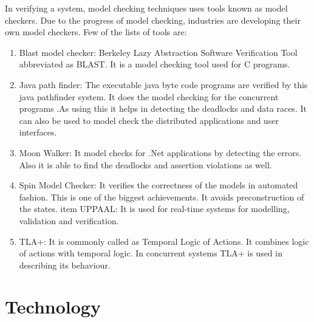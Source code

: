 \documentclass{article}
\begin{document}
In verifying a system, model checking techniques uses tools known as model checkers. Due to the progress of model checking, industries are developing their own model checkers.
Few of the lists of tools are:\newline
\begin{enumerate}
\item  Blast model checker: Berkeley Lazy Abstraction Software Verification Tool abbreviated as BLAST. It is a model checking tool used for C programs.\newline
\item Java path finder: The executable java byte code programs are verified by this java pathfinder system. It does the model checking for the concurrent programs .As using this it helps in detecting the deadlocks and data races. It can also be used to model check the distributed applications and user interfaces.\newline
\item Moon Walker: It model checks for .Net applications by detecting the errors. Also it is able to find the deadlocks and assertion violations as well.\newline
\item Spin Model Checker: It verifies the correctness of the models in automated fashion. This is one of the biggest achievements. It avoids preconstruction of the states.\newline
item UPPAAL: It is used for real-time systems for modelling, validation and verification.\newline
\item TLA+: It is commonly called as Temporal Logic of Actions. It combines logic of actions with temporal logic. In concurrent systems TLA+ is used in describing its behaviour.\newline

\end{enumerate}



\section{Technology}
\label{sec:Technology}
\end{document}
